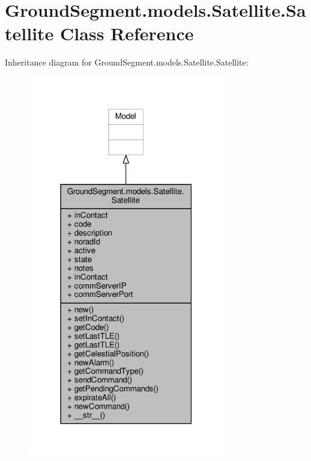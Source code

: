 \hypertarget{class_ground_segment_1_1models_1_1_satellite_1_1_satellite}{}\section{Ground\+Segment.\+models.\+Satellite.\+Satellite Class Reference}
\label{class_ground_segment_1_1models_1_1_satellite_1_1_satellite}


Inheritance diagram for Ground\+Segment.\+models.\+Satellite.\+Satellite\+:\nopagebreak
\begin{figure}[H]
\begin{center}
\leavevmode
\includegraphics[width=243pt]{class_ground_segment_1_1models_1_1_satellite_1_1_satellite__inherit__graph}
\end{center}
\end{figure}


